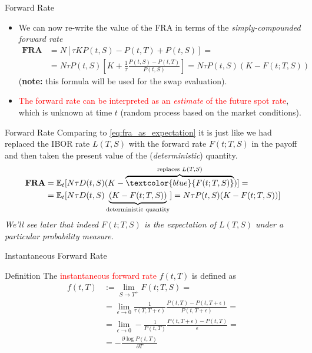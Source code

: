 \documentclass{beamer}
\begin{document}
\begin{frame}{Forward Rate}
	\begin{itemize}
		\item We can now re-write the value of the FRA in terms of the \emph{simply-compounded forward rate}
		\begin{equation}
			\begin{aligned}
			\textbf{FRA}&=N[\tau KP(t,S)-P(t,T)+P(t,S)] = \\
			&=N\tau P(t,S) \left[K +\frac{1}{\tau} \frac{P(t,S)-P(t,T)}{P(t,S)}\right] = N\tau P(t,S)(K-F(t;T,S))
			\end{aligned}
			\label{eq:fram_payoff_withF}
		\end{equation}
		(\textbf{note:} this formula will be used for the swap evaluation).
		\item<2-> \textcolor{red}{The forward rate can be interpreted as an \emph{estimate} of the future spot rate}, which is unknown at time $t$ (random process based on the market conditions).
	\end{itemize}
\end{frame}

\begin{frame}{Forward Rate}
	Comparing to \cref{eq:fra_as_expectation} it is just like we had replaced the IBOR rate $L(T,S)$ with the forward rate $F(t;T,S)$ in the payoff and then taken the present value of the (\emph{deterministic}) quantity.
	\begin{equation*}
		\begin{aligned}
			\textbf{FRA} &= \mathbb{E}_t[N\tau D(t,S)(K-\overbrace{\textcolor{blue}{F(t; T, S)}}^{\text{replaces } L(T, S)})] = \\
			& = \mathbb{E}_t[N\tau D(t,S)\underbrace{(K-F(t; T, S))}_{\text{deterministic quantity}}] = N\tau P(t,S)(K-F(t; T, S))]
		\end{aligned}
	\end{equation*}
	\emph{We'll see later that indeed $F(t;T,S)$ is the expectation of $L(T,S)$ under a particular probability measure.}
\end{frame}

\begin{frame}{Instantaneous Forward Rate}
	\begin{block}{Definition}
	The \textcolor{red}{instantaneous forward rate} $f(t, T)$ is defined as 
	\begin{equation}
		\begin{aligned}
			f(t, T) &:= \lim_{S\rightarrow T^+} F(t;T,S) =\\
			& = \lim_{\epsilon\rightarrow 0}  \frac{1}{\tau(T,T+\epsilon)}\frac{P(t,T)-P(t,T+\epsilon)}{P(t,T+\epsilon)} = \\
			& = \lim_{\epsilon\rightarrow 0} - \frac{1}{P(t,T)} \frac{P(t,T+\epsilon)-P(t,T)}{\epsilon} =\\
			& = -\frac{\partial \log P(t, T)}{\partial T}
		\end{aligned}
	\end{equation}
\myendproof
	\end{block}
\end{frame}
\end{document}
